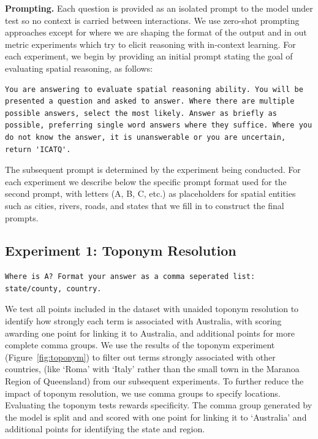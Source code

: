 \textbf{Prompting.} 
Each question is provided as an isolated prompt to the model under test so no context is carried between interactions.
We use zero-shot prompting approaches except for where we are shaping the format of the output and in out metric experiments which try to elicit reasoning with in-context learning. 
For each experiment, we begin by providing an initial prompt stating the goal of evaluating spatial reasoning, as follows:

\begin{lstlisting}[title=Prompt 1: Initial System Prompt]
    You are answering to evaluate spatial reasoning ability. You will be presented a question and asked to answer. Where there are multiple possible answers, select the most likely. Answer as briefly as possible, preferring single word answers where they suffice. Where you do not know the answer, it is unanswerable or you are uncertain, return 'ICATQ'.
\end{lstlisting}

\noindent The subsequent prompt is determined by the experiment being conducted.
For each experiment we describe below the specific prompt format used for the second prompt, with letters (A, B, C, etc.) as placeholders for spatial entities such as cities, rivers, roads, and states that we fill in to construct the final prompts.


\subsection{Experiment 1: Toponym Resolution}

\begin{lstlisting}[title=Prompt 2: Toponym Resolution Prompt]
    Where is A? Format your answer as a comma seperated list: state/county, country.
\end{lstlisting}

\noindent We test all points included in the dataset with unaided toponym resolution to identify how strongly each term is associated with Australia, with scoring awarding one point for linking it to Australia, and additional points for more complete comma groups.
We use the results of the toponym experiment (Figure~\ref{fig:toponym}) to filter out terms strongly associated with other countries, (like `Roma' with `Italy' rather than the small town in the Maranoa Region of Queensland) from our subsequent experiments. 
To further reduce the impact of toponym resolution, we use comma groups to specify locations.
Evaluating the toponym tests rewards specificity.
The comma group generated by the model is split and and scored with one point for linking it to `Australia' and additional points for identifying the state and region.

